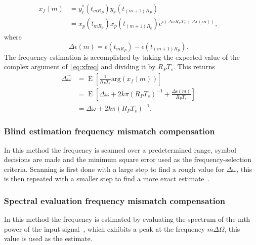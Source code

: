 \begin{refsection}
\begin{equation}\label{eq:xfreq}
\begin{aligned}
x_f(m)&=y_r^*(t_{mR_P})y_r(t_{(m+1)R_P})\\
&=x_p(t_{mR_p})x_p(t_{(m+1)R_p})e^{i\left(\Delta\omega R_PT_s+\Delta\epsilon(m)\right)},
\end{aligned}
\end{equation}
where
\begin{equation}
\Delta\epsilon(m)=\epsilon(t_{mR_P})-\epsilon(t_{(m+1)R_P}).
\end{equation}
The frequency estimation is accomplished by taking the expected value of the complex argument of~\eqref{eq:xfreq} and dividing it by $R_PT_s$. This returns
\begin{equation}\label{eq:omegaEst}
\begin{aligned}
\Delta\hat{\omega}&=\operatorname{E}\left[\frac{1}{R_PT_s}\text{arg}(x_f(m))\right]\\
&=\operatorname{E}\left[\Delta\omega+2k\pi(R_PT_s)^{-1}+\frac{\Delta\epsilon(m)}{R_PT_s}\right]\\
&=\Delta\omega+2k\pi(R_PT_s)^{-1}.
\end{aligned}
\end{equation}

\subsubsection*{Blind estimation frequency mismatch compensation}

In this method the frequency is scanned over a predetermined range, symbol decisions are made and the minimum square error used as the frequency-selection criteria. Scanning is first done with a large step to find a rough value for $\Delta\omega$, this is then repeated with a smaller step to find a more exact estimate~\cite{zhou11}.

\subsubsection*{Spectral evaluation frequency mismatch compensation}

In this method the frequency is estimated by evaluating the spectrum of the mth power of the input signal~\cite{selmi09}, which exhibits a peak at the frequency $m\Delta\Omega$, this value is used as the estimate.


\clearpage
\printbibliography[heading=subbibliography]
\end{refsection}
\cleardoublepage
